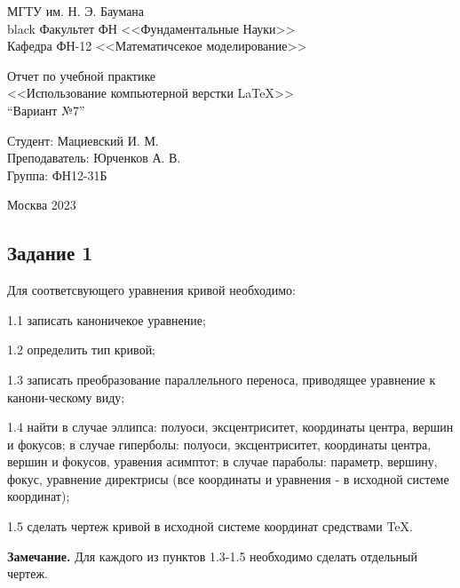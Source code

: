 \documentclass[12pt, a4paper]{article}
\begin{document}
\renewcommand{\labelenumii}{\arabic{enumi}.\arabic{enumii}}
\begin{titlepage}
    \begin{center}
	МГТУ им. Н. Э. Баумана\\black
	Факультет ФН <<Фундаментальные Науки>>\\
	Кафедра ФН-12 <<Математичсекое моделирование>>
	
	\vspace{8cm}
	Отчет по учебной практике\\
	<<Использование компьютерной верстки \LaTeX>>\\
    ``Вариант №7''
\end{center}
\begin{flushright}
	\vspace{10cm}
	Студент: Мациевский И. М. \\
	Преподаватель: Юрченков А. В.\\
	Группа: ФН12-31Б
\end{flushright}

\begin{center}
	\vspace{1cm}
	Москва 2023
\end{center}
\end{titlepage}

\newpage
\begin{center}
    \section*{Задание 1}
\end{center}
\justifying
Для соответсвующего уравнения кривой необходимо:
\par  1.1 записать каноничекое уравнение;
\par  1.2 определить тип кривой;
\par  1.3 записать преобразование параллельного переноса, приводящее уравнение к канони-ческому виду; 
\par 1.4 найти в случае эллипса: полуоси, эксцентриситет, координаты центра, вершин и фокусов; в случае гиперболы: полуоси, эксцентриситет, координаты центра, вершин и фокусов, уравения асимптот; в случае параболы: параметр, вершину, фокус, уравнение директрисы (все координаты и уравнения - в исходной системе координат);
\par  1.5 сделать чертеж кривой в исходной системе координат средствами \TeX.
\par \textbf{Замечание.} Для каждого из пунктов 1.3-1.5 необходимо сделать отдельный чертеж.
\end{document}
